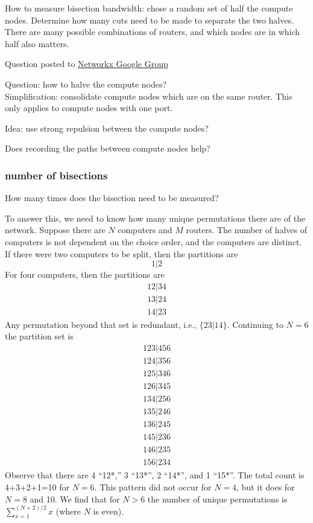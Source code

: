 \documentclass[pdftex]{article}
\begin{document}
How to measure bisection bandwidth: chose a random set of half the compute nodes. Determine how many cuts need to be made to separate the two halves. There are many possible combinations of routers, and which nodes are in which half also matters.

Question posted to \href{https://groups.google.com/d/topic/networkx-discuss/hv_SzY-uaTw/discussion}{Networkx Google Group}

Question: how to halve the compute nodes?\\

Simplification: consolidate compute nodes which are on the same router. This only applies to compute nodes with one port.

Idea: use strong repulsion between the compute nodes?

Does recording the paths between compute nodes help?

\subsubsection{number of bisections}
How many times does the bisection need to be measured?

To answer this, we need to know how many unique permutations there are of the network. Suppose there are $N$ computers and $M$ routers. The number of halves of computers is not dependent on the choice order, and the computers are distinct. If there were two computers to be split, then the partitions are
\begin{equation}
{1|2} 
\end{equation}
For four computers, then the partitions are
\begin{equation}
\begin{gathered}
{12|34}\\
{13|24}\\
{14|23}
\end{gathered}
\end{equation}
Any permutation beyond that set is redundant, i.e., $\{23|14\}$. Continuing to $N=6$ the partition set is
\begin{equation}
\begin{gathered}
{123|456}\\
{124|356}\\
{125|346}\\
{126|345}\\
{134|256}\\
{135|246}\\
{136|245}\\
{145|236}\\
{146|235}\\
{156|234}
\end{gathered}
\end{equation}
Observe that there are 4 ``12*,'' 3 ``13*'', 2 ``14*'', and 1 ``15*''. The total count is 4+3+2+1=10 for $N=6$. This pattern did not occur for $N=4$, but it does for $N=8$ and 10. We find that for $N>6$ the number of unique permutations is $\sum_{x=1}^{(N+2)/2}x$ (where $N$ is even).
\end{document}

